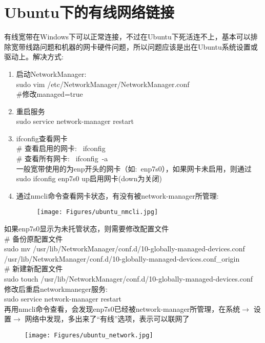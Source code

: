 \documentclass[10pt, oneside, a4paper]{article}      %
\begin{document}
\section{\rm{Ubuntu}下的有线网络链接}
有线宽带在\textrm{Windows}下可以正常连接，不过在\textrm{Ubuntu}下死活连不上，基本可以排除宽带线路问题和机器的网卡硬件问题，所以问题应该是出在\textrm{Ubuntu}系统设置或驱动上。解决方式:
\begin{enumerate}
	\item 启动\textrm{NetworkManager}:\\
		\textrm{sudo vim /etc/NetworkManager/NetworkManager.conf} \\
		\#修改managed=true
	\item 重启服务\\
		\textrm{sudo service network-manager restart}
	\item \textrm{ifconfig}查看网卡 \\
		\# 查看启用的网卡:~ \textrm{ifconfig}\\
		\# 查看所有网卡:~\textrm{ ifconfig~-a}\\
一般宽带使用的为\textrm{enp}开头的网卡（如:~\textrm{enp7s0}），如果网卡未启用，则通过\\
\textrm{sudo ifconfig enp7s0 up}启用网卡(\textrm{down}为关闭)
	\item 通过\textrm{nmcli}命令查看网卡状态，有没有被\textrm{network-manager}所管理:
\begin{figure}[h!]
\centering
\texttt{[image: Figures/ubuntu\_nmcli.jpg]}
\label{ubuntu_nmcli}
\end{figure}
\end{enumerate}

如果\textrm{enp7s0}显示为未托管状态，则需要修改配置文件\\
\# 备份原配置文件\\
\textrm{sudo mv /usr/lib/NetworkManager/conf.d/10-globally-managed-devices.conf  /usr/lib/NetworkManager/conf.d/10-globally-managed-devices.conf\_origin}\\
\# 新建新配置文件\\
\textrm{sudo touch /usr/lib/NetworkManager/conf.d/10-globally-managed-devices.conf}\\
修改后重启\textrm{networkmaneger}服务:\\
\textrm{sudo service network-manager restart}\\
再用\textrm{nmcli}命令查看，会发现\textrm{enp7s0}已经被\textrm{network-manager}所管理，在系统$\rightarrow$ 设置$\rightarrow$ 网络中发现，多出来了“有线”选项，表示可以联网了
\begin{figure}[h!]
\centering
\texttt{[image: Figures/ubuntu\_network.jpg]}
\label{ubuntu_network}
\end{figure}
\end{document}
